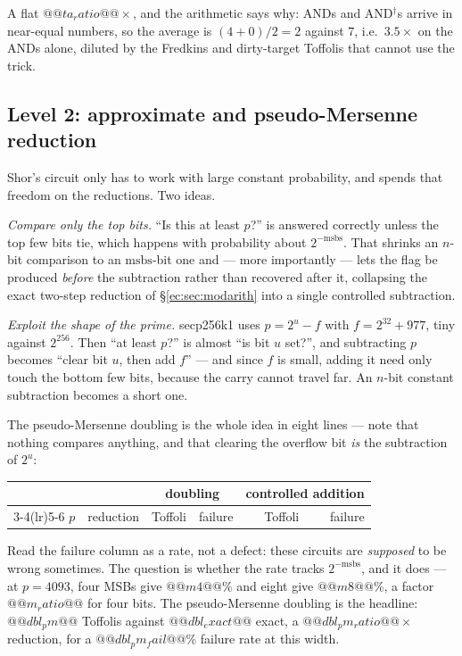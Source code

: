 \noindent
A flat $@@ta_ratio@@\times$, and the arithmetic says why: ANDs and AND$^\dagger$s arrive in
near-equal numbers, so the average is $(4+0)/2=2$ against $7$, i.e.\ $3.5\times$ on the ANDs alone,
diluted by the Fredkins and dirty-target Toffolis that cannot use the trick.

\subsection{Level 2: approximate and pseudo-Mersenne reduction}\label{ec:sec:approx}

Shor's circuit only has to work with large constant probability, and \cite{ec:schrott26} spends
that freedom on the reductions. Two ideas.

\emph{Compare only the top bits.} ``Is this at least $p$?'' is answered correctly unless the top
few bits tie, which happens with probability about $2^{-\mathrm{msbs}}$. That shrinks an $n$-bit
comparison to an $\mathrm{msbs}$-bit one and --- more importantly --- lets the flag be produced
\emph{before} the subtraction rather than recovered after it, collapsing the exact two-step
reduction of \S\ref{ec:sec:modarith} into a single controlled subtraction.

\emph{Exploit the shape of the prime.} secp256k1 uses $p=2^{u}-f$ with $f=2^{32}+977$, tiny against
$2^{256}$. Then ``at least $p$?'' is almost ``is bit $u$ set?'', and subtracting $p$ becomes ``clear
bit $u$, then add $f$'' --- and since $f$ is small, adding it need only touch the bottom few bits,
because the carry cannot travel far. An $n$-bit constant subtraction becomes a short one.

The pseudo-Mersenne doubling is the whole idea in eight lines --- note that nothing compares
anything, and that clearing the overflow bit \emph{is} the subtraction of $2^u$:


\begin{center}\small
\begin{tabular}{@{}rlrrrr@{}}
\toprule
& & \multicolumn{2}{c}{doubling} & \multicolumn{2}{c}{controlled addition}\\
\cmidrule(lr){3-4}\cmidrule(lr){5-6}
$p$ & reduction & Toffoli & failure & Toffoli & failure\\
\midrule
\bottomrule
\end{tabular}
\end{center}

\noindent
Read the failure column as a rate, not a defect: these circuits are \emph{supposed} to be wrong
sometimes. The question is whether the rate tracks $2^{-\mathrm{msbs}}$, and it does --- at
$p=4093$, four MSBs give $@@m4@@\%$ and eight give $@@m8@@\%$, a factor $@@m_ratio@@$ for four
bits. The pseudo-Mersenne doubling is the headline: $@@dbl_pm@@$ Toffolis against $@@dbl_exact@@$
exact, a $@@dbl_pm_ratio@@\times$ reduction, for a $@@dbl_pm_fail@@\%$ failure rate at this width.


